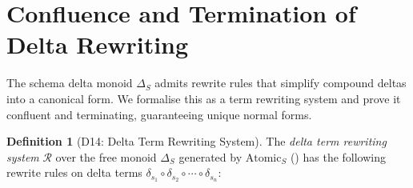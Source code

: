 \documentclass[11pt,a4paper]{article}
\theoremstyle{definition}
\newtheorem{definition}[theorem]{Definition}
\newcommand{\DeltaS}{\Delta_{\!S}}
\begin{document}
\section{Confluence and Termination of Delta Rewriting}
\label{sec:rewriting}

The schema delta monoid $\DeltaS$ admits rewrite rules that simplify compound
deltas into a canonical form.  We formalise this as a term rewriting system and
prove it confluent and terminating, guaranteeing unique normal forms.

\begin{definition}[D14: Delta Term Rewriting System]\label{def:dtrs}
The \emph{delta term rewriting system} $\mathcal{R}$ over the free monoid
$\DeltaS$ generated by $\mathrm{Atomic}_S$ ()
has the following rewrite rules on delta terms
$\delta_{s_1} \circ \delta_{s_2} \circ \cdots \circ \delta_{s_n}$:


\end{definition}
\end{document}
